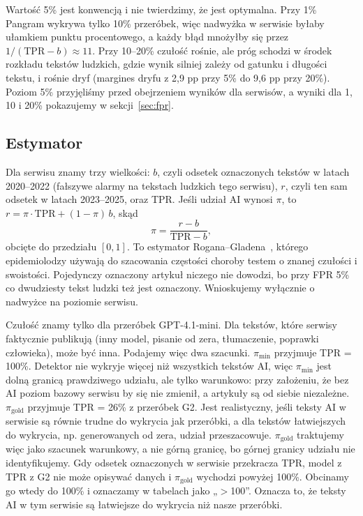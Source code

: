 \documentclass[11pt,a4paper]{article}
\newcommand{\pimin}{\ensuremath{\pi_{\mathrm{min}}}}
\newcommand{\pigold}{\ensuremath{\pi_{\mathrm{gold}}}}
\begin{document}
Wartość 5\% jest konwencją i nie twierdzimy, że jest optymalna. Przy 1\% Pangram wykrywa tylko 10\% przeróbek, więc nadwyżka w serwisie byłaby ułamkiem punktu procentowego, a każdy błąd mnożyłby się przez $1/(\mathrm{TPR}-b)\approx 11$. Przy 10--20\% czułość rośnie, ale próg schodzi w środek rozkładu tekstów ludzkich, gdzie wynik silniej zależy od gatunku i długości tekstu, i rośnie dryf (margines dryfu z 2,9 pp przy 5\% do 9,6 pp przy 20\%). Poziom 5\% przyjęliśmy przed obejrzeniem wyników dla serwisów, a wyniki dla 1, 10 i 20\% pokazujemy w sekcji~\ref{sec:fpr}.

\subsection{Estymator}\label{sec:estymator}

Dla serwisu znamy trzy wielkości: $b$, czyli odsetek oznaczonych tekstów w latach 2020--2022 (fałszywe alarmy na tekstach ludzkich tego serwisu), $r$, czyli ten sam odsetek w latach 2023--2025, oraz TPR. Jeśli udział AI wynosi $\pi$, to $r=\pi\cdot\mathrm{TPR}+(1-\pi)\,b$, skąd
\begin{equation}
\pi=\frac{r-b}{\mathrm{TPR}-b},
\end{equation}
obcięte do przedziału $[0,1]$. To estymator Rogana--Gladena~\cite{rogan}, którego epidemiolodzy używają do szacowania częstości choroby testem o znanej czułości i swoistości. Pojedynczy oznaczony artykuł niczego nie dowodzi, bo przy FPR 5\% co dwudziesty tekst ludzki też jest oznaczony. Wnioskujemy wyłącznie o nadwyżce na poziomie serwisu.

Czułość znamy tylko dla przeróbek GPT-4.1-mini. Dla tekstów, które serwisy faktycznie publikują (inny model, pisanie od zera, tłumaczenie, poprawki człowieka), może być inna. Podajemy więc dwa szacunki. \pimin{} przyjmuje TPR = 100\%. Detektor nie wykryje więcej niż wszystkich tekstów AI, więc \pimin{} jest dolną granicą prawdziwego udziału, ale tylko warunkowo: przy założeniu, że bez AI poziom bazowy serwisu by się nie zmienił, a artykuły są od siebie niezależne. \pigold{} przyjmuje TPR = 26\% z przeróbek G2. Jest realistyczny, jeśli teksty AI w serwisie są równie trudne do wykrycia jak przeróbki, a dla tekstów łatwiejszych do wykrycia, np. generowanych od zera, udział przeszacowuje. \pigold{} traktujemy więc jako szacunek warunkowy, a nie górną granicę, bo górnej granicy udziału nie identyfikujemy. Gdy odsetek oznaczonych w serwisie przekracza TPR, model z TPR z G2 nie może opisywać danych i \pigold{} wychodzi powyżej 100\%. Obcinamy go wtedy do 100\% i oznaczamy w tabelach jako „$>$100”. Oznacza to, że teksty AI w tym serwisie są łatwiejsze do wykrycia niż nasze przeróbki.
\end{document}
